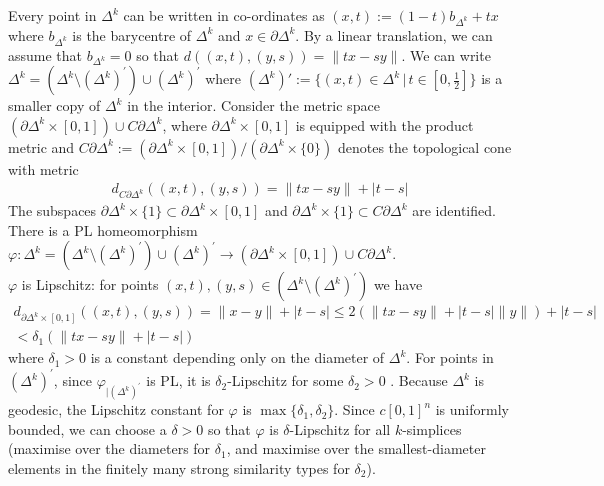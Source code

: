 \documentclass[a4paper,11pt]{article}
\theoremstyle{definition}
\theoremstyle{plain}
\theoremstyle{remark}
\begin{document}
{Every point in $\Delta^{k}$ can be written in co-ordinates as $(x,t):=(1-t)b_{\Delta^{k}}+t x$ where $b_{\Delta^{k}}$ is the barycentre of $\Delta^{k}$ and $x\in \partial \Delta^{k}$.  By a linear translation, we can assume that $b_{\Delta^{k}} = 0$ so that $d((x,t),(y,s)) = \|tx-sy\|$.  We can write $\Delta^k = (\Delta^k\setminus  (\Delta^{k})^{'}) \cup (\Delta^{k})^{'}$ where $(\Delta^{k})':=\{(x,t)\in \Delta^{k}\,|\, t\in [0,\frac{1}{2}]\}$ is a smaller copy of $\Delta^k$ in the interior. Consider the metric space  $(\partial{\Delta^k} \times [0,1]) \cup C\partial\Delta^{k}$, where $\partial{\Delta^k} \times [0,1]$ is equipped with the product metric and $C\partial\Delta^{k}:= (\partial \Delta^{k} \times [0,1]) / (\partial \Delta^{k} \times \{0\})$ denotes the topological cone with metric 
\begin{align*}
d_{C\partial\Delta^{k}}((x,t),(y,s)) = \|tx-sy\| + |t-s|
\end{align*}
The subspaces $\partial \Delta^{k} \times \{1\}\subset \partial{\Delta^k} \times [0,1]$ and $\partial \Delta^{k} \times \{1\} \subset C\partial\Delta^{k}$ are identified.  There is a PL homeomorphism $\varphi: \Delta^k=(\Delta^k\setminus  (\Delta^{k})^{'}) \cup (\Delta^{k})^{'}\rightarrow (\partial{\Delta^k} \times [0,1]) \cup C\partial\Delta^{k}$. \\

$\varphi$ is Lipschitz: for points $(x,t),(y,s)\in (\Delta^k\setminus  (\Delta^{k})^{'})$ we have 
\begin{align*}
d_{\partial{\Delta^k} \times [0,1]}((x,t),(y,s)) = \|x-y\| + |t-s| \leq 2(\|tx-sy\|+|t-s|\|y\|) + |t-s|\\
 < \delta_1(\|tx-sy\|+|t-s|)
\end{align*}
where $\delta_1>0$ is a constant depending only on the diameter of $\Delta^{k}$. For points in $(\Delta^{k})^{'}$, since $\varphi_{|(\Delta^{k})^{'}}$ is PL, it is $\delta_{2}$-Lipschitz for some $\delta_{2}>0$ . Because $\Delta^{k}$ is geodesic, the Lipschitz constant for $\varphi$ is $\max \{\delta_1,\delta_2\}$. Since $c[0,1]^n$ is uniformly bounded, we can choose a $\delta>0$ so that $\varphi$ is $\delta$-Lipschitz for all $k$-simplices (maximise over the diameters for $\delta_{1}$, and maximise over the smallest-diameter elements in the finitely many strong similarity types for $\delta_{2}$).\\

}
\end{document}
